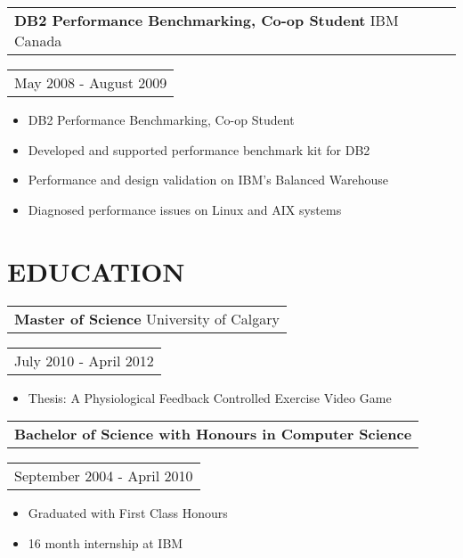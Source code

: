 \documentclass{resume}
\begin{document}
\begin{resume}
    \begin{tabular}[t]{@{}l}
        {\bf DB2 Performance Benchmarking, Co-op Student} IBM Canada
    \end{tabular}\vspace{+0.05in}
    \hfill
    \begin{tabular}[t]{l@{}}
        May 2008 - August 2009
    \end{tabular}
	\begin{itemize} \itemsep -2pt
    \item DB2 Performance Benchmarking, Co-op Student
    \item Developed and supported performance benchmark kit for DB2
    \item Performance and design validation on IBM’s Balanced Warehouse
    \item Diagnosed performance issues on Linux and AIX systems
    \end{itemize}

\section{EDUCATION}
    \vspace{+0.1in}
    \begin{tabular}[t]{@{}l}
        {\bf Master of Science} University of Calgary
    \end{tabular}\vspace{+0.05in}
    \hfill
    \begin{tabular}[t]{l@{}}
        July 2010 - April 2012
    \end{tabular}
    \begin{itemize} \itemsep -2pt
    \item Thesis: A Physiological Feedback Controlled Exercise Video Game
    \end{itemize}

    \begin{tabular}[t]{@{}l}
        {\bf Bachelor of Science with Honours in Computer Science}
    \end{tabular}\vspace{+0.05in}
    \hfill
    \begin{tabular}[t]{l@{}}
        September 2004 - April 2010
    \end{tabular}
    \begin{itemize} \itemsep -2pt
    \item Graduated with First Class Honours
    \item 16 month internship at IBM
    \end{itemize}


\end{resume}
\end{document}
